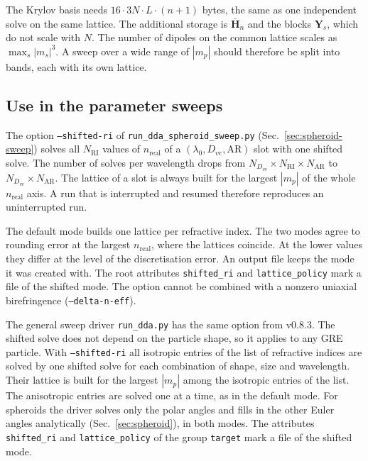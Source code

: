 \documentclass[11pt,a4paper]{article}
\begin{document}
The Krylov basis needs $16 \cdot 3N \cdot L \cdot (n+1)$ bytes, the
same as one independent solve on the same lattice.
The additional storage is $\bar{\mathbf{H}}_n$ and the blocks
$\mathbf{Y}_s$, which do not scale with $N$.
The number of dipoles on the common lattice scales as
$\max_s |m_s|^3$.
A sweep over a wide range of $|m_p|$ should therefore be split into
bands, each with its own lattice.

\subsection{Use in the parameter sweeps}
\label{sec:shift-sweep}

The option \texttt{--shifted-ri} of
\texttt{run\_dda\_spheroid\_sweep.py} (Sec.~\ref{sec:spheroid-sweep})
solves all $N_{\mathrm{RI}}$ values of $n_{\mathrm{real}}$ of a
$(\lambda_0, D_{ve}, \mathrm{AR})$ slot with one shifted solve.
The number of solves per wavelength drops from
$N_{D_{ve}} \times N_{\mathrm{RI}} \times N_{\mathrm{AR}}$ to
$N_{D_{ve}} \times N_{\mathrm{AR}}$.
The lattice of a slot is always built for the largest $|m_p|$ of the
whole $n_{\mathrm{real}}$ axis.
A run that is interrupted and resumed therefore reproduces an
uninterrupted run.

The default mode builds one lattice per refractive index.
The two modes agree to rounding error at the largest
$n_{\mathrm{real}}$, where the lattices coincide.
At the lower values they differ at the level of the discretisation
error.
An output file keeps the mode it was created with.
The root attributes \texttt{shifted\_ri} and \texttt{lattice\_policy}
mark a file of the shifted mode.
The option cannot be combined with a nonzero uniaxial birefringence
(\texttt{--delta-n-eff}).

The general sweep driver \texttt{run\_dda.py} has the same option from
v0.8.3.
The shifted solve does not depend on the particle shape, so it applies
to any GRE particle.
With \texttt{--shifted-ri} all isotropic entries of the list of
refractive indices are solved by one shifted solve for each combination
of shape, size and wavelength.
Their lattice is built for the largest $|m_p|$ among the isotropic
entries of the list.
The anisotropic entries are solved one at a time, as in the default
mode.
For spheroids the driver solves only the polar angles and fills in the
other Euler angles analytically (Sec.~\ref{sec:spheroid}),
in both modes.
The attributes \texttt{shifted\_ri} and \texttt{lattice\_policy} of
the group \texttt{target} mark a file of the shifted mode.
\end{document}
